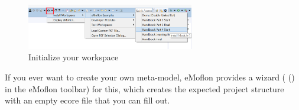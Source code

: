 \begin{figure}[htbp]
\begin{center}
  \includegraphics[width=0.65\textwidth]{../../org.moflon.doc.handbook.04_tripleGraphTransformations/2_settingUp/2.1_startingFresh/eclipse_part4FreshWizardDownload}
  \caption{Initialize your workspace}
  \label{eclipse:downPartIV}
\end{center}
\end{figure} 

If you ever want to create your own meta-model, eMoflon provides a wizard ( (\eMoflonCreateNewRepositoryProjectIcon) in the eMoflon toolbar) for this, which creates the expected project structure with an empty ecore file that you can fill out.
